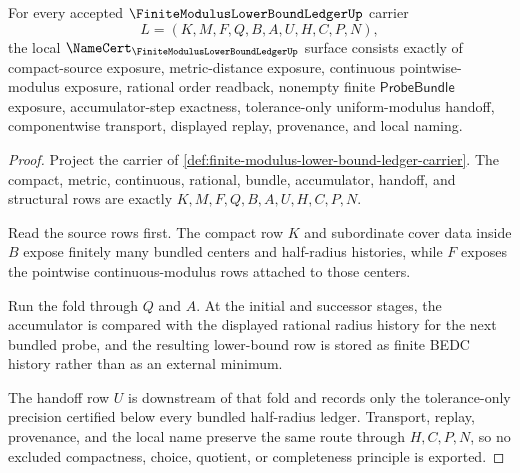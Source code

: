 \begin{theorem}
\label{thm:finite-modulus-lower-bound-ledger-fold-obligation}
For every accepted $\FiniteModulusLowerBoundLedgerUp$ carrier
$$
L=(K,M,F,Q,B,A,U,H,C,P,N),
$$
the local $\NameCert_{\FiniteModulusLowerBoundLedgerUp}$ surface consists exactly of compact-source exposure, metric-distance exposure, continuous pointwise-modulus exposure, rational order readback, nonempty finite $\mathsf{ProbeBundle}$ exposure, accumulator-step exactness, tolerance-only uniform-modulus handoff, componentwise transport, displayed replay, provenance, and local naming.
\end{theorem}
\begin{proof}
Project the carrier of \autoref{def:finite-modulus-lower-bound-ledger-carrier}. The compact, metric, continuous, rational, bundle, accumulator, handoff, and structural rows are exactly $K,M,F,Q,B,A,U,H,C,P,N$.

Read the source rows first. The compact row $K$ and subordinate cover data inside $B$ expose finitely many bundled centers and half-radius histories, while $F$ exposes the pointwise continuous-modulus rows attached to those centers.

Run the fold through $Q$ and $A$. At the initial and successor stages, the accumulator is compared with the displayed rational radius history for the next bundled probe, and the resulting lower-bound row is stored as finite BEDC history rather than as an external minimum.

The handoff row $U$ is downstream of that fold and records only the tolerance-only precision certified below every bundled half-radius ledger. Transport, replay, provenance, and the local name preserve the same route through $H,C,P,N$, so no excluded compactness, choice, quotient, or completeness principle is exported.
\end{proof}


